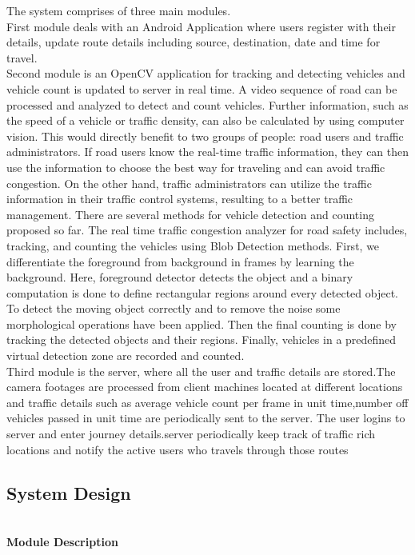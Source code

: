 The system comprises of three main modules.\\

First module deals with an Android Application where users register with their details, update route details including source, destination, date and time for travel. \\

Second module is an OpenCV application for tracking and detecting vehicles and vehicle count is updated to server in real time. A video sequence of road can be processed and analyzed to detect and count vehicles. Further information, such as the speed of a vehicle or traffic density, can also be calculated by using computer vision. This would directly benefit to two groups of people: road users and traffic administrators. If road users know the real-time traffic information, they can then use the information to choose the best way for traveling and can avoid traffic congestion. On the other hand, traffic administrators can utilize the traffic information in their traffic control systems, resulting to a better traffic management. There are several methods for vehicle detection and counting proposed so far. The real time traffic congestion analyzer for road safety includes, tracking, and counting the vehicles using Blob Detection methods. First, we differentiate the foreground from background in frames by learning the background. Here, foreground detector detects the object and a binary computation is done to define rectangular regions around every detected object. To detect the moving object correctly and to remove the noise some morphological operations have been applied. Then the final counting is done by tracking the detected objects and their regions. Finally, vehicles in a predefined virtual detection zone are recorded and counted.\\

Third module is the server, where all the user and traffic details are stored.The camera footages are processed from client machines located at different locations and traffic details such as average vehicle count per frame in unit time,number off vehicles passed in unit time are periodically sent to the server.  The user logins to server and enter journey details.server periodically keep track of traffic rich locations and notify the active users who travels through those routes

\newpage

\subsection{System Design}
\\
\textbf{Module Description}\\

